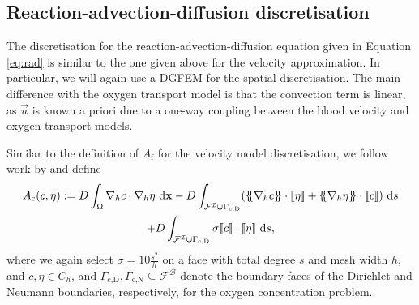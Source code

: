         \subsection{Reaction-advection-diffusion discretisation} \label{sec:numerical-methods:equation-discretisations:rad}
            The discretisation for the reaction-advection-diffusion equation given in Equation \eqref{eq:rad} is similar to the one given above for the velocity approximation. In particular, we will again use a DGFEM for the spatial discretisation. The main difference with the oxygen transport model is that the convection term is linear, as $\vec{u}$ is known a priori due to a one-way coupling between the blood velocity and oxygen transport models.

            Similar to the definition of $A_\text{f}$ for the velocity model discretisation, we follow work by \citeauthor{cangianiHpVersionDiscontinuousGalerkin2017} \cite{cangianiHpVersionDiscontinuousGalerkin2017} and define
            \begin{multline}
                A_\text{c}(c, \eta) := D \int_\Omega \nablab c \cdot \nablab \eta \diff\vec{x} - D \int_{\mathcal{F}^\mathcal{I} \cup \Gamma_\text{c,D}} (\average{\nablab c} \cdot \jump{\eta} + \average{\nablab \eta} \cdot \jump{c}) \diff s \\ + D \int_{\mathcal{F}^\mathcal{I} \cup \Gamma_\text{c,D}} \sigma \jump{c} \cdot \jump{\eta} \diff s,
            \end{multline}
            where we again select $\sigma = 10 \frac{s^2}{h}$ on a face with total degree $s$ and mesh width $h$, and $c, \eta \in C_h$, and $\Gamma_\text{c,D},\Gamma_\text{c,N} \subseteq \mathcal{F}^\mathcal{B}$ denote the boundary faces of the Dirichlet and Neumann boundaries, respectively, for the oxygen concentration problem.

